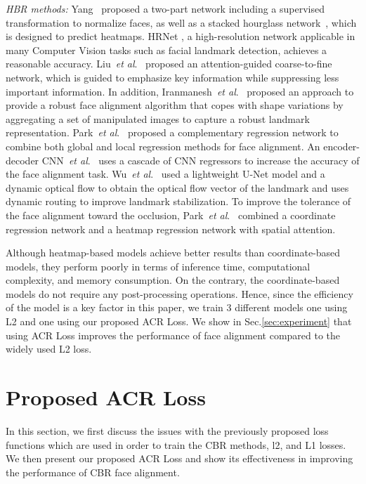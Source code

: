 \documentclass[a4paper,conference]{IEEEtran}
\newcommand{\etal}{\textit{et al}.}
\begin{document}
\textit{HBR methods:}  Yang~\cite{yang2017stacked} proposed a two-part network including a supervised transformation to normalize faces, as well as a stacked hourglass network~\cite{newell2016stacked}, which is designed to predict heatmaps. HRNet \cite{sun2019high}, a high-resolution network applicable in many Computer Vision tasks such as facial landmark detection, achieves a reasonable accuracy.  Liu~\etal~\cite{liu2019attention} proposed an attention-guided coarse-to-fine network, which is guided to emphasize key information while suppressing less important information. In addition, Iranmanesh~\etal~\cite{iranmanesh2020robust} proposed an approach to provide a robust face alignment algorithm that copes with shape variations by aggregating a set of manipulated images to capture a robust landmark representation. Park~\etal~\cite{park2020complementary} proposed a complementary regression network to combine both global and local regression methods for face alignment. An encoder-decoder CNN~\etal~\cite{valle2020cascade} uses a cascade of CNN regressors to increase the accuracy of the face alignment task. Wu~\etal~\cite{wu2021design} used a lightweight U-Net model and a dynamic optical flow to obtain the optical flow vector of the landmark and uses dynamic routing to improve landmark stabilization. To improve the tolerance of the face alignment toward the occlusion, Park~\etal~\cite{park2021acn} combined a coordinate regression network and a heatmap regression network with spatial attention. 

Although heatmap-based models achieve better results than coordinate-based models, they perform poorly in terms of inference time, computational complexity, and memory consumption. On the contrary, the coordinate-based models do not require any post-processing operations. Hence, since the efficiency of the model is a key factor in this paper, we train 3 different models one using L2 and one using our proposed ACR Loss. We show in Sec.\ref{sec:experiment} that using ACR Loss improves the performance of face alignment compared to the widely used L2 loss.



\section{Proposed ACR Loss}\label{sec:Proposed_Arch}
In this section, we first discuss the issues with the previously proposed loss functions which are used in order to train the CBR methods, l2, and L1 losses. We then present our proposed ACR Loss and show its effectiveness in improving the performance of CBR face alignment.
\end{document}
